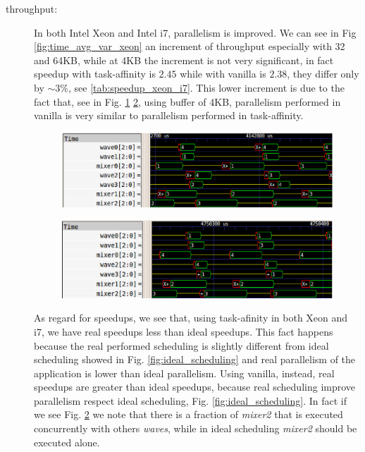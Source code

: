 \begin{description}

\item[throughput:] In both Intel Xeon and Intel i7, parallelism is improved. We can see in Fig \ref{fig:time_avg_var_xeon} an increment of throughput 
especially with 32 and 64KB, while at 4KB the increment is not very significant, in fact speedup with task-affinity is $2.45$ while with vanilla is $2.38$, 
they differ only by $\sim 3\%$, see \ref{tab:speedup_xeon_i7}. This lower increment is due to the fact that, see in Fig. \ref{fig:4KB_xeon_results_taskaff} 
\ref{fig:4KB_xeon_results_van}, using buffer of 4KB, parallelism performed in vanilla is very similar to parallelism performed in task-affinity.

\begin{figure}[htbp]
\centering
\includegraphics[width=\widefigure]{images/results_xeon/4KB_results_xeon_taskaff.eps}
\caption{}
\label{fig:4KB_xeon_results_taskaff}
\end{figure}

\begin{figure}[htbp]
\centering
\includegraphics[width=\widefigure]{images/results_xeon/4KB_results_xeon_van.eps}
\caption{}
\label{fig:4KB_xeon_results_van}
\end{figure}

As regard for speedups, we see that, using task-afinity in both Xeon and i7, we have real speedups less than ideal speedups. This fact happens because the 
real performed scheduling is slightly different from ideal scheduling showed in Fig.  \ref{fig:ideal_scheduling} and real parallelism of the application is 
lower than ideal parallelism. Using vanilla, instead, real speedups are greater than ideal speedups, because real scheduling improve parallelism respect 
ideal scheduling, Fig.  \ref{fig:ideal_scheduling}. In fact if we see Fig. \ref{fig:4KB_xeon_results_van} we note that there is a fraction of \textit{mixer2} 
that is executed concurrently with others \textit{waves}, while in ideal scheduling \textit{mixer2} should be executed alone.


\end{description}
